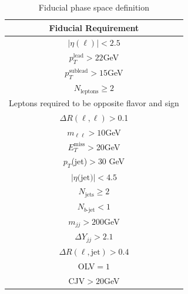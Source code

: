 \begin{table}[!ht]
\centering
\begin{tabular}{|c|}
\hline
Fiducial Requirement \\
\hline
$|\eta(\ell)|<2.5$ \\
$p_T^{\text{lead}}>22$GeV \\
$p_T^{\text{sublead}}>15$GeV \\
$N_{\text{leptons}}\geq2$ \\
Leptons required to be opposite flavor and sign \\
$\Delta R(\ell,\ell) >$0.1 \\
$m_{\ell\ell}>10$GeV \\
$E_T^{\text{miss}}>$20GeV \\
$p_T$(jet)$>$30 GeV \\
$|\eta\text{(jet)}|<4.5$ \\ 
$N_{\text{jets}} \geq 2$ \\
$N_{b\text{-jet}} < 1$ \\
$m_{jj} >200$GeV \\
$\Delta Y_{jj}>2.1$ \\
$\Delta R(\ell,\text{jet})>0.4$ \\
OLV$=1$ \\
CJV$>20$GeV \\
\hline
\end{tabular}
\caption{Fiducial phase space definition}
\label{tab:fiducial}
\end{table}

